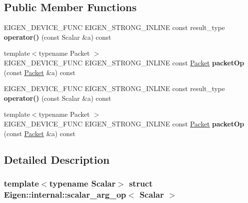 \subsection*{Public Member Functions}
\begin{DoxyCompactItemize}
\item 
\mbox{\label{struct_eigen_1_1internal_1_1scalar__arg__op_ae469b50e2c22f750e702832636f391c7}} 
E\+I\+G\+E\+N\+\_\+\+D\+E\+V\+I\+C\+E\+\_\+\+F\+U\+NC E\+I\+G\+E\+N\+\_\+\+S\+T\+R\+O\+N\+G\+\_\+\+I\+N\+L\+I\+NE const result\+\_\+type {\bfseries operator()} (const Scalar \&a) const
\item 
\mbox{\label{struct_eigen_1_1internal_1_1scalar__arg__op_a45c9306e3c96d90a66afed69e0a8247c}} 
{\footnotesize template$<$typename Packet $>$ }\\E\+I\+G\+E\+N\+\_\+\+D\+E\+V\+I\+C\+E\+\_\+\+F\+U\+NC E\+I\+G\+E\+N\+\_\+\+S\+T\+R\+O\+N\+G\+\_\+\+I\+N\+L\+I\+NE const \hyperlink{union_eigen_1_1internal_1_1_packet}{Packet} {\bfseries packet\+Op} (const \hyperlink{union_eigen_1_1internal_1_1_packet}{Packet} \&a) const
\item 
\mbox{\label{struct_eigen_1_1internal_1_1scalar__arg__op_ae469b50e2c22f750e702832636f391c7}} 
E\+I\+G\+E\+N\+\_\+\+D\+E\+V\+I\+C\+E\+\_\+\+F\+U\+NC E\+I\+G\+E\+N\+\_\+\+S\+T\+R\+O\+N\+G\+\_\+\+I\+N\+L\+I\+NE const result\+\_\+type {\bfseries operator()} (const Scalar \&a) const
\item 
\mbox{\label{struct_eigen_1_1internal_1_1scalar__arg__op_a45c9306e3c96d90a66afed69e0a8247c}} 
{\footnotesize template$<$typename Packet $>$ }\\E\+I\+G\+E\+N\+\_\+\+D\+E\+V\+I\+C\+E\+\_\+\+F\+U\+NC E\+I\+G\+E\+N\+\_\+\+S\+T\+R\+O\+N\+G\+\_\+\+I\+N\+L\+I\+NE const \hyperlink{union_eigen_1_1internal_1_1_packet}{Packet} {\bfseries packet\+Op} (const \hyperlink{union_eigen_1_1internal_1_1_packet}{Packet} \&a) const
\end{DoxyCompactItemize}


\subsection{Detailed Description}
\subsubsection*{template$<$typename Scalar$>$\newline
struct Eigen\+::internal\+::scalar\+\_\+arg\+\_\+op$<$ Scalar $>$}



